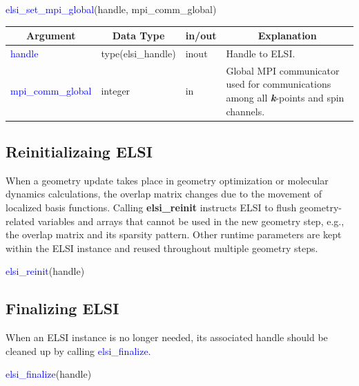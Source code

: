 \documentclass{report}
\begin{document}
\begin{labeling}{\hspace{6cm}}
\item [\hspace{0.3cm} \textcolor{blue}{elsi\_set\_mpi\_global}(handle, mpi\_comm\_global)]
\end{labeling}

\begin{tabular}[]{|p{30mm}|p{30mm}|p{15mm}|p{90mm}|}
\hline
\multicolumn{1}{|c|}{\textbf{Argument}} & \multicolumn{1}{c|}{\textbf{Data Type}} & \multicolumn{1}{c|}{\textbf{in/out}} & \multicolumn{1}{c|}{\textbf{Explanation}}\\
\hline
\textcolor{blue}{handle}            & type(elsi\_handle) & inout & Handle to ELSI.\\
\hline
\textcolor{blue}{mpi\_comm\_global} & integer            & in    & Global MPI communicator used for communications among all \textbf{\textit{k}}-points and spin channels.\\
\hline
\end{tabular}

\subsection{Reinitializaing ELSI}
\label{subsec:setup_reinit}
When a geometry update takes place in geometry optimization or molecular dynamics calculations, the overlap matrix changes due to the movement of localized basis functions.  Calling \textbf{elsi\_reinit} instructs ELSI to flush geometry-related variables and arrays that cannot be used in the new geometry step, e.g., the overlap matrix and its sparsity pattern.  Other runtime parameters are kept within the ELSI instance and reused throughout multiple geometry steps.
\begin{labeling}{\hspace{6cm}}
\item [\hspace{0.3cm} \textcolor{blue}{elsi\_reinit}(handle)]
\end{labeling}

\subsection{Finalizing ELSI}
\label{subsec:setup_final}
When an ELSI instance is no longer needed, its associated handle should be cleaned up by calling \textcolor{blue}{elsi\_finalize}.
\begin{labeling}{\hspace{6cm}}
\item [\hspace{0.3cm} \textcolor{blue}{elsi\_finalize}(handle)]
\end{labeling}
\end{document}
